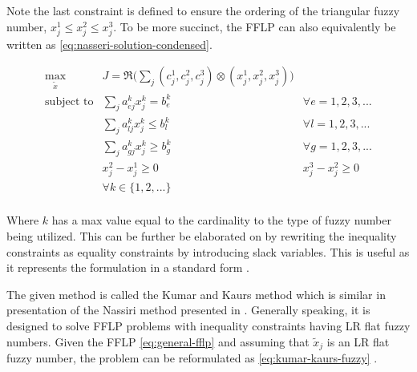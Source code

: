 \documentclass[ee,msthesis]{usuthesis}
\begin{document}
\noindent Note the last constraint is defined to ensure the ordering of the triangular fuzzy number, \(x_j^1 \le x_j^2 \le x_j^3\).
To be more succinct, the FFLP can also equivalently be written as \ref{eq:nasseri-solution-condensed}.

\begin{equation}
\label{eq:nasseri-solution-condensed}
\begin{array}{llc}
\underset{{\tilde{x}}}{\text{max}} & J = \mathfrak{R}\Big(\sum_j (c_j^1,c_j^2,c_j^3) \otimes (x_j^1,x_j^2,x_j^3)\Big) &\\
\text{subject to} & \sum_j a_{ej}^k x_j^k = b_e^k &  \forall e = 1,2,3,... \\
                  & \sum_j a_{lj}^k x_j^k \le b_l^k &  \forall l = 1,2,3,... \\
                  & \sum_j a_{gj}^k x_j^k \ge b_g^k  &  \forall g = 1,2,3,... \\
                  & x_j^2 - x_j^1 \ge 0         & x_j^3 - x_j^2 \ge 0 \\
                  & \forall k \in \{1,2,...\}        &                  \\
\end{array}
\end{equation}

Where \(k\) has a max value equal to the cardinality to the type of fuzzy number being utilized. This can be further be
elaborated on by rewriting the inequality constraints as equality constraints by introducing slack variables. This is
useful as it represents the formulation in a standard form \cite{chen-2010-applied,vanderbei-2020-linear-progr}.

The given method is called the Kumar and Kaurs method \cite{kaur-2016-introd-fuzzy} which is similar in presentation of
the Nassiri method presented in \cite{bello-2019-fuzzy-activ}. Generally speaking, it is designed to solve FFLP
problems with inequality constraints having LR flat fuzzy numbers. Given the FFLP \ref{eq:general-fflp} and assuming that
\(\tilde{x}_j\) is an LR flat fuzzy number, the problem can be reformulated as \ref{eq:kumar-kaurs-fuzzy}
\cite{kaur-2016-introd-fuzzy}.
\end{document}
